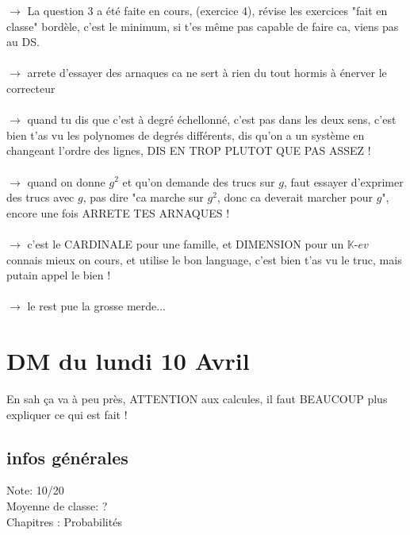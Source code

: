 \documentclass{book}
\begin{document}
$\rightarrow$ La question 3 a été faite en cours, (exercice 4), révise les exercices "fait en classe" bordèle, c'est le minimum, si t'es même pas capable de faire ca, viens pas au DS. \\ \\
$\rightarrow$ arrete d'essayer des arnaques ca ne sert à rien du tout hormis à énerver le correcteur \\ \\
$\rightarrow$ quand tu dis que c'est à degré échellonné, c'est pas dans les deux sens, c'est bien t'as vu les polynomes de degrés différents, dis qu'on a un système en changeant l'ordre des lignes, DIS EN TROP PLUTOT QUE PAS ASSEZ ! \\ \\
$\rightarrow$ quand on donne $g^2$ et qu'on demande des trucs sur $g$, faut essayer d'exprimer des trucs avec $g$, pas dire "ca marche sur $g^2$, donc ca deverait marcher pour $g$", encore une fois ARRETE TES ARNAQUES ! \\ \\
$\rightarrow$ c'est le CARDINALE pour une famille, et DIMENSION pour un $\mathbb{K}$-$ev$ connais mieux on cours, et utilise le bon language, c'est bien t'as vu le truc, mais putain appel le bien ! \\ \\
$\rightarrow$ le rest pue la grosse merde...




\section{DM du lundi 10 Avril}

\begin{tcolorbox}[width={14cm},colback={yellow!20!white},title={\textbf{Commentaire générale sur ce DM}},colbacktitle=red!40!white,coltitle=black]    
	En sah ça va à peu près, ATTENTION aux calcules, il faut BEAUCOUP plus expliquer ce qui est fait !
\end{tcolorbox}


\subsection{infos générales}

Note: 10/20\\
Moyenne de classe: ? \\

Chapitres : Probabilités \\ \\
\end{document}
